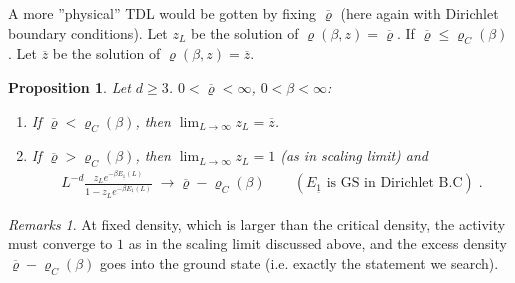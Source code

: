 \documentclass[
a4paper, %
11pt, %
onecolumn, %
openany, %
]{memoir}
\theoremstyle{definition}
\theoremstyle{remark}
\newtheorem{remarks}[definition]{Remarks}
\theoremstyle{plain}
\newtheorem{prop}[definition]{Proposition}
\begin{document}
A more ''physical'' TDL would be gotten by fixing $\overline{\varrho}$ (here again with Dirichlet boundary conditions). Let $z_L$ be the solution of $\varrho(\beta,z)=\overline{\varrho}$. If $\overline{\varrho}\leq \varrho_C(\beta)$. Let $\overline{z}$ be the solution of $\varrho(\beta,z)=\overline{z}$. \begin{prop}
	Let $d\geq 3$. $0<\overline{\varrho}<\infty$, $0<\beta<\infty$: \begin{enumerate}
		\item If $\overline{\varrho}<\varrho_C(\beta)$, then $\lim_{L\rightarrow\infty}z_L=\overline{z}$.
		\item If $\overline{\varrho}>\varrho_C(\beta)$, then $\lim_{L\rightarrow\infty}z_L=1$ (as in scaling limit) and \begin{align}
		L^{-d}\frac{z_Le^{-\beta E_{\underline{1}}(L)}}{1-z_Le^{-\beta E_{\underline{1}}(L)}}\; \longrightarrow \overline{\varrho}-\varrho_C(\beta)\qquad (E_{\underline{1}}\text{ is GS in Dirichlet B.C})\; .
		\end{align}
	\end{enumerate}
\end{prop}
\begin{remarks}
	At fixed density, which is larger than the critical density, the activity must converge to $1$ as in the scaling limit discussed above, and the excess density $\overline{\varrho}-\varrho_C(\beta)$ goes into the ground state (i.e. exactly the statement we search).
\end{remarks}
\end{document}
